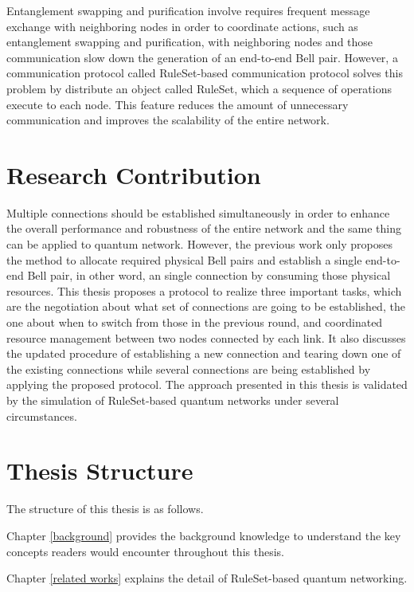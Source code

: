 Entanglement swapping and purification involve requires frequent message exchange with neighboring nodes in order to coordinate actions, such as entanglement swapping and purification, with neighboring nodes and those communication slow down the generation of an end-to-end Bell pair.
However, a communication protocol \cite{matsuo2019quantum} called RuleSet-based communication protocol solves this problem by distribute an object called RuleSet, which a sequence of operations execute to each node. This feature reduces the amount of unnecessary communication and improves the scalability of the entire network.

\section{Research Contribution}
\label{introduction:research-contribution}

Multiple connections should be established simultaneously in order to enhance the overall performance and robustness of the entire network and the same thing can be applied to quantum network. 
However, the previous work only proposes the method to allocate required physical Bell pairs and establish a single end-to-end Bell pair, in other word, an single connection by consuming those physical resources.
This thesis proposes a protocol to realize three important tasks, which are the negotiation about what set of connections are going to be established, the one about when to switch from those in the previous round, and coordinated resource management between two nodes connected by each link.
It also discusses the updated procedure of establishing a new connection and tearing down one of the existing connections while several connections are being established by applying the proposed protocol.
The approach presented in this thesis is validated by the simulation of RuleSet-based quantum networks under several circumstances.

\section{Thesis Structure}
\label{introduction:thesis-structure} 

The structure of this thesis is as follows. 

Chapter \ref{background} provides the background knowledge to understand the key concepts readers would encounter throughout this thesis.

Chapter \ref{related works} explains the detail of RuleSet-based quantum networking.

